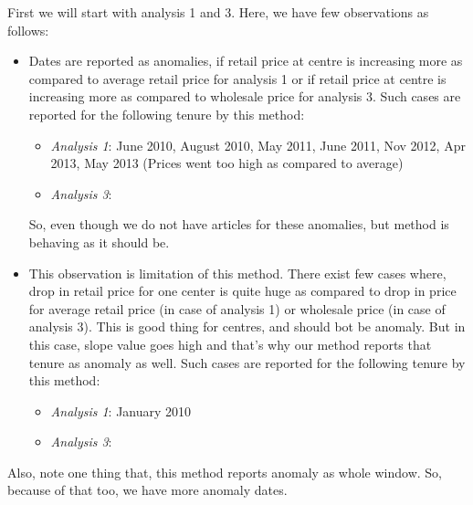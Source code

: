 \documentclass[a4paper,10pt]{report}
\begin{document}
		First we will start with analysis 1 and 3. Here, we have few observations as follows:
		\begin{itemize}
			\item Dates are reported as anomalies, if retail price at centre is increasing more as compared to average retail price for analysis 1 or if retail price at centre is increasing more as compared to wholesale price for analysis 3.
			Such cases are reported for the following tenure by this method:
			\begin{itemize}
				\item \textit{Analysis 1}: June 2010, August 2010, May 2011, June 2011, Nov 2012, Apr 2013, May 2013 (Prices went too high as compared to average)
				\item \textit{Analysis 3}:
			\end{itemize}
			
			So, even though we do not have articles for these anomalies, but method is behaving as it should be. 			
			
			\item This observation is limitation of this method. There exist few cases where, drop in retail price for one center is quite huge as compared to drop in price for average retail price (in case of analysis 1) or wholesale price (in case of analysis 3). This is good thing for centres, and should bot be anomaly. But in this case, slope value goes high and that's why our method reports that tenure as anomaly as well.
			Such cases are reported for the following tenure by this method:
			\begin{itemize}
				\item \textit{Analysis 1}: January 2010
				\item \textit{Analysis 3}:
			\end{itemize}
			
		\end{itemize}
		


	Also, note one thing that, this method reports anomaly as whole window. So, because of that too, we have more anomaly dates.
	
\end{document}
